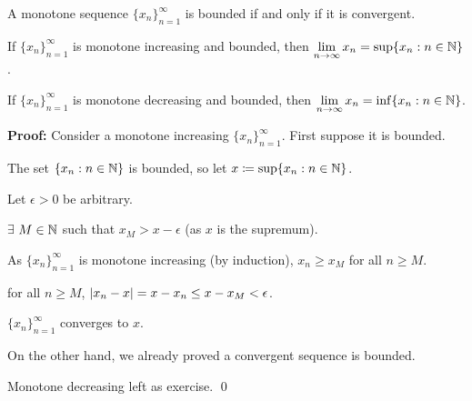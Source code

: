 \documentclass[10pt,aspectratio=169]{beamer}
\begin{document}
\begin{frame}

\begin{proposition}
A monotone sequence $\{ x_n \}_{n=1}^\infty$ is bounded if and only if it is convergent.

\pause
If $\{ x_n \}_{n=1}^\infty$ is monotone increasing and bounded, then \quad
$\displaystyle
\lim_{n\to \infty} x_n = \sup \{ x_n : n \in {\mathbb{N}} \}$.

\pause
If $\{ x_n \}_{n=1}^\infty$ is monotone decreasing and bounded, then \quad
$\displaystyle
\lim_{n\to \infty} x_n = \inf \{ x_n : n \in {\mathbb{N}} \}$.
\end{proposition}

\pause

\textbf{Proof:}
Consider a monotone increasing $\{x_n\}_{n=1}^\infty$.  First suppose it is bounded.

\pause
The set $\{ x_n : n \in  {\mathbb{N}} \}$ is bounded, so let
\quad $x \coloneqq \sup \{ x_n : n \in {\mathbb{N}} \}$.

\pause
Let $\epsilon > 0$ be arbitrary.

\pause
$\exists$ $M \in {\mathbb{N}}$ such that $x_{M} > x-\epsilon$ \quad (as $x$ is the supremum).

\pause
As $\{ x_n \}_{n=1}^\infty$ is monotone increasing (by induction),
\quad $x_n \geq x_M$ for all $n \geq M$.

\pause
\thus \quad for all $n \geq M$,
\quad $\left\lvert {x_n-x} \right\rvert = x-x_n \leq x-x_{M} < \epsilon$.

\pause
\thus \quad $\{x_n \}_{n=1}^\infty$ converges to $x$.

\medskip
\pause

On the other hand, we already proved a convergent sequence is bounded.

\medskip
\pause

Monotone decreasing left as exercise.
\qed

\end{frame}
\end{document}
